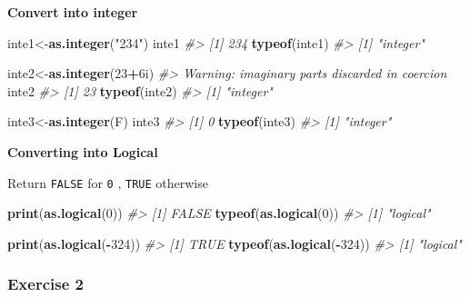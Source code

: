 \documentclass[
]{book}
\newenvironment{Shaded}{\begin{snugshade}}{\end{snugshade}}
\newcommand{\CommentTok}[1]{\textcolor[rgb]{0.56,0.35,0.01}{\textit{#1}}}
\newcommand{\DataTypeTok}[1]{\textcolor[rgb]{0.13,0.29,0.53}{#1}}
\newcommand{\DecValTok}[1]{\textcolor[rgb]{0.00,0.00,0.81}{#1}}
\newcommand{\FunctionTok}[1]{\textcolor[rgb]{0.13,0.29,0.53}{\textbf{#1}}}
\newcommand{\NormalTok}[1]{#1}
\newcommand{\OtherTok}[1]{\textcolor[rgb]{0.56,0.35,0.01}{#1}}
\newcommand{\SpecialCharTok}[1]{\textcolor[rgb]{0.81,0.36,0.00}{\textbf{#1}}}
\newcommand{\StringTok}[1]{\textcolor[rgb]{0.31,0.60,0.02}{#1}}
\begin{document}
\textbf{Convert into integer}

\begin{Shaded}
\begin{Highlighting}[]
\NormalTok{inte1}\OtherTok{\textless{}{-}}\FunctionTok{as.integer}\NormalTok{(}\StringTok{"234"}\NormalTok{)}
\NormalTok{inte1}
\CommentTok{\#\textgreater{} [1] 234}
\FunctionTok{typeof}\NormalTok{(inte1)}
\CommentTok{\#\textgreater{} [1] "integer"}

\NormalTok{inte2}\OtherTok{\textless{}{-}}\FunctionTok{as.integer}\NormalTok{(}\DecValTok{23}\SpecialCharTok{+}\DecValTok{6}\DataTypeTok{i}\NormalTok{)}
\CommentTok{\#\textgreater{} Warning: imaginary parts discarded in coercion}
\NormalTok{inte2}
\CommentTok{\#\textgreater{} [1] 23}
\FunctionTok{typeof}\NormalTok{(inte2)}
\CommentTok{\#\textgreater{} [1] "integer"}

\NormalTok{inte3}\OtherTok{\textless{}{-}}\FunctionTok{as.integer}\NormalTok{(F)}
\NormalTok{inte3}
\CommentTok{\#\textgreater{} [1] 0}
\FunctionTok{typeof}\NormalTok{(inte3)}
\CommentTok{\#\textgreater{} [1] "integer"}
\end{Highlighting}
\end{Shaded}

\textbf{Converting into Logical}

Return \texttt{FALSE} for \texttt{0} , \texttt{TRUE} otherwise

\begin{Shaded}
\begin{Highlighting}[]
\FunctionTok{print}\NormalTok{(}\FunctionTok{as.logical}\NormalTok{(}\DecValTok{0}\NormalTok{))}
\CommentTok{\#\textgreater{} [1] FALSE}
\FunctionTok{typeof}\NormalTok{(}\FunctionTok{as.logical}\NormalTok{(}\DecValTok{0}\NormalTok{))}
\CommentTok{\#\textgreater{} [1] "logical"}

\FunctionTok{print}\NormalTok{(}\FunctionTok{as.logical}\NormalTok{(}\SpecialCharTok{{-}}\DecValTok{324}\NormalTok{))}
\CommentTok{\#\textgreater{} [1] TRUE}
\FunctionTok{typeof}\NormalTok{(}\FunctionTok{as.logical}\NormalTok{(}\SpecialCharTok{{-}}\DecValTok{324}\NormalTok{))}
\CommentTok{\#\textgreater{} [1] "logical"}
\end{Highlighting}
\end{Shaded}

\subsubsection*{Exercise 2}\label{exercise-2}
\end{document}
